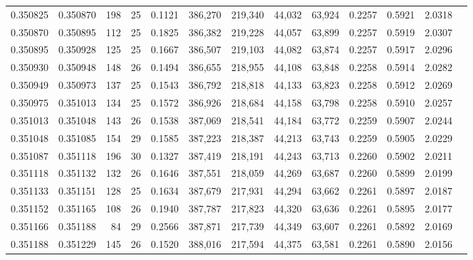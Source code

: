 \begin{tabular}{rrrrrrrrrrrrr}
0.350825 & 0.350870 &   198 &  25 &                                     0.1121 & 386,270 & 219,340 &  44,032 &  63,924 & 0.2257 & 0.5921 & 2.0318 \\
0.350870 & 0.350895 &   112 &  25 &                                     0.1825 & 386,382 & 219,228 &  44,057 &  63,899 & 0.2257 & 0.5919 & 2.0307 \\
0.350895 & 0.350928 &   125 &  25 &                                     0.1667 & 386,507 & 219,103 &  44,082 &  63,874 & 0.2257 & 0.5917 & 2.0296 \\
0.350930 & 0.350948 &   148 &  26 &                                     0.1494 & 386,655 & 218,955 &  44,108 &  63,848 & 0.2258 & 0.5914 & 2.0282 \\
0.350949 & 0.350973 &   137 &  25 &                                     0.1543 & 386,792 & 218,818 &  44,133 &  63,823 & 0.2258 & 0.5912 & 2.0269 \\
0.350975 & 0.351013 &   134 &  25 &                                     0.1572 & 386,926 & 218,684 &  44,158 &  63,798 & 0.2258 & 0.5910 & 2.0257 \\
0.351013 & 0.351048 &   143 &  26 &                                     0.1538 & 387,069 & 218,541 &  44,184 &  63,772 & 0.2259 & 0.5907 & 2.0244 \\
0.351048 & 0.351085 &   154 &  29 &                                     0.1585 & 387,223 & 218,387 &  44,213 &  63,743 & 0.2259 & 0.5905 & 2.0229 \\
0.351087 & 0.351118 &   196 &  30 &                                     0.1327 & 387,419 & 218,191 &  44,243 &  63,713 & 0.2260 & 0.5902 & 2.0211 \\
0.351118 & 0.351132 &   132 &  26 &                                     0.1646 & 387,551 & 218,059 &  44,269 &  63,687 & 0.2260 & 0.5899 & 2.0199 \\
0.351133 & 0.351151 &   128 &  25 &                                     0.1634 & 387,679 & 217,931 &  44,294 &  63,662 & 0.2261 & 0.5897 & 2.0187 \\
0.351152 & 0.351165 &   108 &  26 &                                     0.1940 & 387,787 & 217,823 &  44,320 &  63,636 & 0.2261 & 0.5895 & 2.0177 \\
0.351166 & 0.351188 &    84 &  29 &                                     0.2566 & 387,871 & 217,739 &  44,349 &  63,607 & 0.2261 & 0.5892 & 2.0169 \\
0.351188 & 0.351229 &   145 &  26 &                                     0.1520 & 388,016 & 217,594 &  44,375 &  63,581 & 0.2261 & 0.5890 & 2.0156 \\

\end{tabular}
